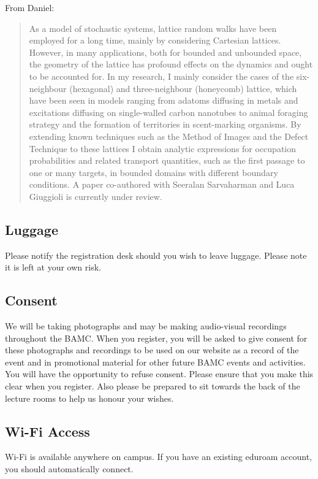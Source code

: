 \documentclass[12pt,a4paper]{article}
\begin{document}
From Daniel:
\begin{quote}
As a model of stochastic systems, lattice random walks have been employed for a long time, mainly by considering Cartesian lattices. However, in many applications, both for bounded and unbounded space, the geometry of the lattice has profound effects on the dynamics and ought to be accounted for. In my research, I mainly consider the cases of the six-neighbour (hexagonal) and three-neighbour (honeycomb) lattice, which have been seen in models ranging from adatoms diffusing in metals and excitations diffusing on single-walled carbon nanotubes to animal foraging strategy and the formation of territories in scent-marking organisms. By extending known techniques such as the Method of Images and the Defect Technique to these lattices I obtain analytic expressions for occupation probabilities and related transport quantities, such as the first passage to one or many targets, in bounded domains with different boundary conditions. A paper co-authored with Seeralan Sarvaharman and Luca Giuggioli is currently under review. 
\end{quote}

\subsection{Luggage}

Please notify the registration desk should you wish to leave luggage. Please note it is left at your own risk.

\subsection{Consent}

We will be taking photographs and may be making audio-visual recordings throughout the BAMC. When you register, you will be asked to give consent for these photographs and recordings to be used on our website as a record of the event and in promotional material for other future BAMC events and activities. You will have the opportunity to refuse consent. Please ensure that you make this clear when you register. Also please be prepared to sit towards the back of the lecture rooms to help us honour your wishes.

\subsection{Wi-Fi Access}

Wi-Fi is available anywhere on campus. If you have an existing eduroam account, you should automatically connect. 
\end{document}
